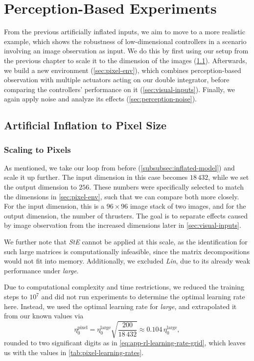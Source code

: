 \chapter{Perception-Based Experiments}
\label{chap:perception}

From the previous artificially inflated inputs, we aim to move to a more realistic
example, which shows the robustness of low-dimensional controllers in a scenario involving
an image observation as input. We do this by first using our setup from the previous
chapter to scale it to the dimension of the images (\cref{sec:pixel-inflation}). Afterwards, we
build a new environment (\cref{sec:pixel-env}), which combines perception-based observation with
multiple actuators acting on our double integrator, before comparing the controllers' performance
on it (\cref{sec:visual-inputs}). Finally, we again apply noise and analyze its effects (\cref{sec:perception-noise}).

\section{Artificial Inflation to Pixel Size}
\label{sec:pixel-inflation}

\subsection{Scaling to Pixels}
\label{subsec:pixel-inflation-setting}

As mentioned, we take our loop from before (\cref{subsubsec:inflated-model}) and scale it up further. The input
dimension in this case becomes $18\,432$, while we set the output dimension to $256$. These numbers
were specifically selected to match the dimensions in \cref{sec:pixel-env}, such that we can
compare both more closely. For the input dimension, this is a $96 \times 96$ image stack of two images,
and for the output dimension, the number of thrusters. The goal is to separate effects caused by image observation from
the increased dimensions later in \cref{sec:visual-inputs}.

We further note that \emph{StE} cannot be applied at this scale, as the identification
for such large matrices is computationally infeasible, since the matrix decompositions would not fit into
memory. Additionally, we excluded \emph{Lin}, due to its already weak performance under \emph{large}.

Due to computational complexity and time restrictions, we reduced the training steps to $10^{7}$ and
did not run experiments to determine the optimal learning rate here. Instead, we used the optimal
learning rate for \emph{large}, and extrapolated it from our known values via
\begin{equation}
    \label{eq:pixel-learning-rate}
    \eta_0^{\mathrm{pixel}}
    = \eta_0^{\mathrm{large}} \sqrt{\frac{200}{18\,432}}
    \approx 0.104\, \eta_0^{\mathrm{large}} ,
\end{equation}
rounded to two significant digits as in \eqref{eq:app-rl-learning-rate-grid}, which leaves us with the values in \cref{tab:pixel-learning-rates}.


